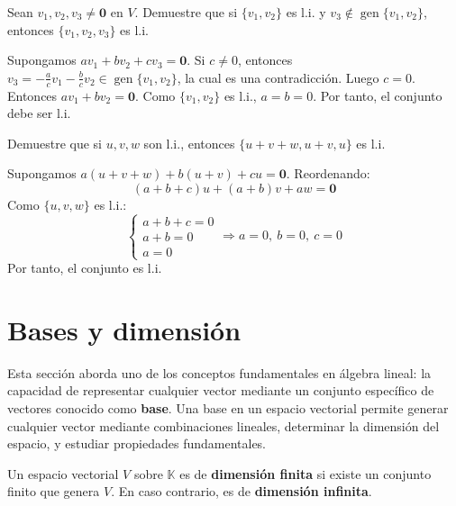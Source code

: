 \begin{prob} Sean $v_1,v_2,v_3 \neq \mathbf{0}$ en $V$. Demuestre que si $\{v_1,v_2\}$ es l.i. y $v_3 \notin \operatorname{gen}\{v_1,v_2\}$, entonces $\{v_1,v_2,v_3\}$ es l.i.

\begin{myproof}
Supongamos $a v_1 + b v_2 + c v_3 = \mathbf{0}$. Si $c \neq 0$, entonces $v_3 = -\tfrac{a}{c}v_1 - \tfrac{b}{c}v_2 \in \operatorname{gen}\{v_1,v_2\}$, la cual es una contradicción. Luego $c=0$. Entonces $a v_1 + b v_2 = \mathbf{0}$. Como $\{v_1,v_2\}$ es l.i., $a=b=0$. Por tanto, el conjunto debe ser l.i.
\end{myproof}
\end{prob}

\begin{prob} Demuestre que si $u,v,w$ son l.i., entonces $\{u+v+w, u+v, u\}$ es l.i.

\begin{myproof}
Supongamos $a(u+v+w) + b(u+v) + c u = \mathbf{0}$. Reordenando:
$$(a + b + c)u + (a + b)v + a w = \mathbf{0}$$
Como $\{u,v,w\}$ es l.i.:
$$\begin{cases} a + b + c = 0 \\ a + b = 0 \\ a = 0 \end{cases} \Rightarrow a=0,\ b=0,\ c=0$$
Por tanto, el conjunto es l.i.
\end{myproof}
\end{prob}



 \section{Bases y dimensión}

Esta sección aborda uno de los conceptos fundamentales en álgebra lineal: la capacidad de representar cualquier vector mediante un conjunto específico de vectores conocido como \textbf{base}. Una base en un espacio vectorial permite generar cualquier vector mediante combinaciones lineales, determinar la dimensión del espacio, y estudiar propiedades fundamentales.

\begin{definition} 
Un espacio vectorial $V$ sobre $\mathbb{K}$ es de \textbf{dimensión finita} si existe un conjunto finito que genera $V$. En caso contrario, es de \textbf{dimensión infinita}.
\end{definition}

